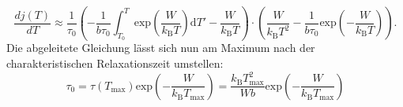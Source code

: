 \begin{equation}
    \frac{dj(T)}{dT} \approx \frac{1}{\tau_0} \left( - \frac{1}{b\tau_0}
    \int_{T_0}^T \text{exp}\left(\frac{W}{k_\text{B}T}\right)\text{d}T' - 
    \frac{W}{k_\text{B}T}\right) \cdot \left( \frac{W}{k_\text{B}T^2} - 
    \frac{1}{b\tau_0} 
    \text{exp}\left(-\frac{W}{k_\text{B}T}\right)\right).
\end{equation}
Die abgeleitete Gleichung lässt sich nun am Maximum nach der charakteristischen Relaxationszeit umstellen:
\begin{equation}
    \tau_0 = \tau(T_\text{max})\text{exp}\left(- \frac{W}{k_\text{B}T_\text{max}}\right) = \frac{k_\text{B}T^2_\text{max}}{Wb}\text{exp}\left(-\frac{W}{k_\text{B}T_\text{max}}\right)
    \label{eqn:taumaxsource}
\end{equation}
